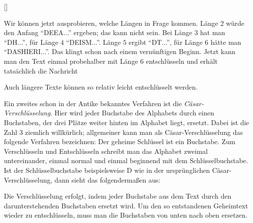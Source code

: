\documentclass{zusammenfassung}
\begin{document}
\def\mytext{DEEHETARIRIESINGMXHSSEETITEHR}
\StrLen{\mytext}[\len]
\begin{center}
\end{center}

Wir können jetzt ausprobieren, welche Längen in Frage kommen. Länge $2$ würde den Anfang "`DEEA..."' ergeben; das kann nicht sein.
Bei Länge $3$ hat man "`DH..."', für Länge $4$ "`DEISM..."'. Länge $5$ ergibt "`DT..."', für Länge $6$ hätte man "`DASHIERI..."'.
Das klingt schon nach einem vernünftigen Beginn. Jetzt kann man den Text einmal probehalber mit Länge $6$ entschlüsseln und erhält
tatsächlich die Nachricht

\begin{center}
\end{center}

Auch längere Texte können so relativ leicht entschlüsselt werden.

Ein zweites schon in der Antike bekanntes Verfahren ist die \emph{Cäsar-Verschlüsselung}. Hier wird jeder Buchstabe des Alphabets
durch einen Buchstaben, der drei Plätze weiter hinten im Alphabet liegt, ersetzt. Dabei ist die Zahl $3$ ziemlich willkürlich;
allgemeiner kann man als Cäsar-Verschlüsselung das folgende Verfahren bezeichnen: Der geheime Schlüssel ist ein Buchstabe. Zum
Verschlüsseln und Entschlüsseln schreibt man das Alphabet zweimal untereinander, einmal normal und einmal beginnend mit dem
Schlüsselbuchstabe. Ist der Schlüsselbuchstabe beispielsweise D wie in der ursprünglichen Cäsar-Verschlüsselung, dann sieht das
folgendermaßen aus:

\begin{center}
\end{center}

Die Verschlüsselung erfolgt, indem jeder Buchstabe aus dem Text durch den darunterstehenden Buchstaben ersetzt wird. Um den so
entstandenen Geheimtext wieder zu entschlüsseln, muss man die Buchstaben von unten nach oben ersetzen.
\end{document}
